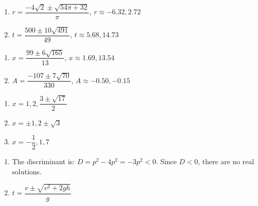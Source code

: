 \documentclass[11pt]{article}
\theoremstyle{definition}  %
\newcounter{HW}
\begin{document}
\begin{multicols}{2}
\begin{enumerate}
\setcounter{enumi}{\value{HW}}
\item $r = \dfrac{-4\sqrt{2} \pm \sqrt{54\pi + 32}}{\pi}$, $r \approx -6.32, 2.72$
\item $t = \dfrac{500 \pm 10\sqrt{491}}{49}$, $t \approx 5.68, 14.73$


\setcounter{HW}{\value{enumi}}
\end{enumerate}
\end{multicols}

\begin{multicols}{2}
\begin{enumerate}
\setcounter{enumi}{\value{HW}}

\item $x = \dfrac{99 \pm 6 \sqrt{165}}{13}$, $x \approx 1.69, 13.54$
\item $A = \dfrac{-107 \pm 7 \sqrt{70}}{330}$, $A \approx -0.50, -0.15$

\setcounter{HW}{\value{enumi}}
\end{enumerate}
\end{multicols}







\begin{multicols}{3}
\begin{enumerate}
\setcounter{enumi}{\value{HW}}

\item $x = 1, 2, \dfrac{3 \pm \sqrt{17}}{2}$
\item $x = \pm 1, 2 \pm \sqrt{3}$ 
\item $x = -\dfrac{1}{2}, 1, 7$

\setcounter{HW}{\value{enumi}}
\end{enumerate}
\end{multicols}

\begin{enumerate}
\setcounter{enumi}{\value{HW}}

\item The discriminant is: $D = p^2 - 4p^2 = -3p^2 < 0$.  Since $D < 0$, there are no real solutions.  

\item $t = \dfrac{v \pm \sqrt{v^2 + 2gh}}{g}$

\setcounter{HW}{\value{enumi}}
\end{enumerate}
\end{document}
